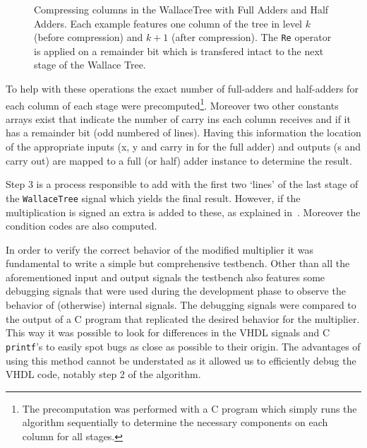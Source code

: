 \begin{figure}[H]
\centering
{}
\caption{Compressing columns in the WallaceTree with Full Adders and Half Adders. Each example features one column of the tree in level $k$ (before compression) and $k+1$ (after compression). The \texttt{Re} operator is applied on a remainder bit which is transfered intact to the next stage of the Wallace Tree.}
\label{fig:wt_compression}
\end{figure}


To help with these operations the exact number of full-adders and half-adders for each column of each stage were precomputed\footnote{The precomputation was performed with a C program which simply runs the algorithm sequentially to determine the necessary components on each column for all stages.}. Moreover two other constants arrays exist that indicate the number of carry ins each column receives and if it has a remainder bit (odd numbered of lines).
Having this information the location of the appropriate inputs (x, y and carry in for the full adder) and outputs (s and carry out) are mapped to a full (or half) adder instance to determine the result.

Step 3 is a process responsible to add with the first two `lines' of the last stage of the \texttt{WallaceTree} signal which yields the final result. However, if the multiplication is signed an extra \STDV is added to these, as explained in~\cite{part3}. Moreover the condition codes are also computed.


In order to verify the correct behavior of the modified multiplier it was fundamental to write a simple but comprehensive testbench.
Other than all the aforementioned input and output signals the testbench also features some debugging signals that were used during the development phase to observe the behavior of (otherwise) internal signals. The debugging signals were compared to the output of a C program that replicated the desired behavior for the multiplier. This way it was possible to look for differences in the VHDL signals and C \texttt{printf}'s to easily spot bugs as close as possible to their origin. The advantages of using this method cannot be understated as it allowed us to efficiently debug the VHDL code, notably step 2 of the algorithm.

